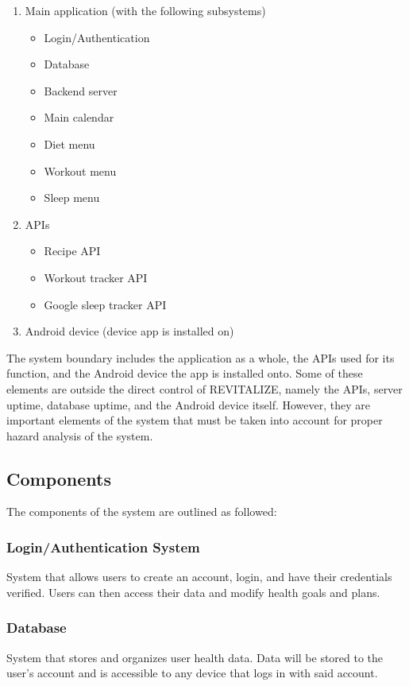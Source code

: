 \documentclass{article}
\begin{document}
\begin{enumerate}
    \item Main application (with the following subsystems)
    \begin{itemize}
        \item Login/Authentication
        \item Database
        \item Backend server
        \item Main calendar
        \item Diet menu
        \item Workout menu
        \item Sleep menu
    \end{itemize}
    \item APIs
    \begin{itemize}
        \item Recipe API
        \item Workout tracker API
        \item Google sleep tracker API
    \end{itemize}
    \item Android device (device app is installed on)
\end{enumerate}

\noindent The system boundary includes the application as a whole, the APIs used for its function, and the Android device the app is installed onto. Some of these elements are outside the direct control of REVITALIZE, namely the APIs, server uptime, database uptime, and the Android device itself. However, they are important elements of the system that must be taken into account for proper hazard analysis of the system.

\subsection{Components}

\noindent The components of the system are outlined as followed:

\subsubsection{Login/Authentication System}
\noindent System that allows users to create an account, login, and have their credentials verified. Users can then access their data and modify health goals and plans.

\subsubsection{Database}
\noindent System that stores and organizes user health data. Data will be stored to the user's account and is accessible to any device that logs in with said account.
\end{document}
